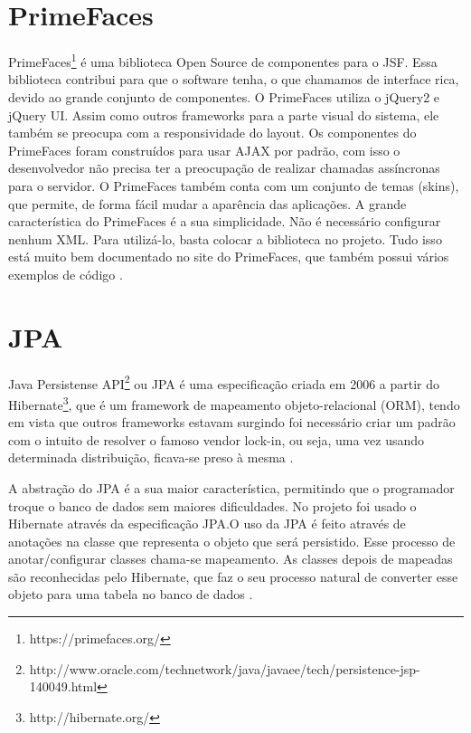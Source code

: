 \section{PrimeFaces}
\label{sec:embasamentoTeoricoPrimeFaces}

PrimeFaces\footnote{https://primefaces.org/} é uma biblioteca Open Source de componentes para o JSF. Essa biblioteca contribui para que o software tenha, o que chamamos de interface rica, devido ao grande conjunto de componentes. O PrimeFaces utiliza o jQuery2 e jQuery UI. Assim como outros frameworks para a parte visual do sistema, ele também se preocupa com a responsividade do layout.
Os componentes do PrimeFaces foram construídos para usar AJAX por padrão, com isso o desenvolvedor não precisa ter a preocupação de realizar chamadas assíncronas para o servidor. O PrimeFaces também conta com um conjunto de temas (skins), que permite, de forma fácil mudar a aparência das aplicações.
A grande característica do PrimeFaces é a sua simplicidade. Não é necessário configurar nenhum XML. Para utilizá-lo, basta colocar a biblioteca no projeto. Tudo isso está muito bem documentado no site do PrimeFaces, que também possui vários exemplos de código \cite{Civici2015}.

\section{JPA}
\label{sec:embasamentoTeoricoJPA}

Java Persistense API\footnote{ http://www.oracle.com/technetwork/java/javaee/tech/persistence-jsp-140049.html} ou JPA é uma especificação criada em 2006 a partir do Hibernate\footnote{http://hibernate.org/}, que é um framework de mapeamento objeto-relacional (ORM), tendo em vista que outros frameworks estavam surgindo foi necessário criar um padrão com o intuito de resolver o famoso vendor lock-in, ou seja, uma vez usando determinada distribuição, ficava-se preso à mesma \cite[p.~12]{Cordeiro2014}.

A abstração do JPA é a sua maior característica, permitindo que o programador troque o banco de dados sem maiores dificuldades. No projeto \imprimirtitulo \space foi usado o Hibernate através da especificação JPA.O uso da JPA é feito através de anotações na classe que representa o objeto que será persistido. Esse processo de anotar/configurar classes chama-se mapeamento. As classes depois de mapeadas são reconhecidas pelo Hibernate, que faz o seu processo natural de converter esse objeto para uma tabela no banco de dados \cite{Cordeiro2014}.

